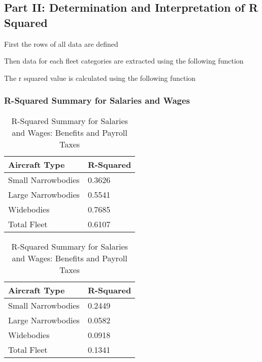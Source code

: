 \subsection{Part II: Determination and Interpretation of R Squared }

First the rows of all data are defined


Then data for each fleet categories are extracted using the following function


The r squared value is calculated using the following function


\subsubsection*{R-Squared Summary for Salaries and Wages}

\begin{table}[htbp]
    \centering
    \begin{minipage}{0.45\textwidth} %
        \centering
        \caption{R-Squared Summary for Salaries and Wages: Pilot Training Data}
        \begin{tabular}{@{}ll@{}}
            \toprule
            \textbf{Aircraft Type} & \textbf{R-Squared} \\ \midrule
            Small Narrowbodies     & 0.3626             \\
            Large Narrowbodies     & 0.5541             \\
            Widebodies             & 0.7685             \\
            Total Fleet            & 0.6107             \\ \bottomrule
        \end{tabular}
    \end{minipage}%
    \hspace{0.05\textwidth} %
    \begin{minipage}{0.45\textwidth}
        \centering
        \caption{R-Squared Summary for Salaries and Wages: Benefits and Payroll Taxes}
        \begin{tabular}{@{}ll@{}}
            \toprule
            \textbf{Aircraft Type} & \textbf{R-Squared} \\ \midrule
            Small Narrowbodies     & 0.2449             \\
            Large Narrowbodies     & 0.0582             \\
            Widebodies             & 0.0918             \\
            Total Fleet            & 0.1341             \\ \bottomrule
        \end{tabular}
    \end{minipage}
\end{table}

